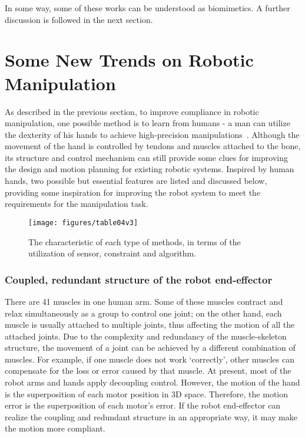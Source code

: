 \documentclass[journal,twoside,web]{ieeecolor}
\begin{document}
In some way, some of these works can be understood as biomimetics. A further discussion is followed in the next section.

\section{Some New Trends on Robotic Manipulation}
\label{sec:compliant_advanced}

As described in the previous section, to improve compliance in robotic manipulation, one possible method is to learn from humans - a man can utilize the dexterity of his hands to achieve high-precision manipulations~\cite{Wu2015}. 
Although the movement of the hand is controlled by tendons and muscles attached to the bone, its structure and control mechanism can still provide some clues for improving the design and motion planning for existing robotic systems. 
Inspired by human hands, two possible but essential features are listed and discussed below, providing some inspiration for improving the robot system to meet the requirements for the manipulation task.


\begin{figure*}[h]
    \centering
    \texttt{[image: figures/table04v3]}
    \caption{The characteristic of each type of methods, in terms of the utilization of sensor, constraint and algorithm.}
    \label{fig:table02}
\end{figure*}

\subsubsection{Coupled, redundant structure of the robot end-effector}

There are 41 muscles in one human arm. 
Some of these muscles contract and relax simultaneously as a group to control one joint; on the other hand, each muscle is usually attached to multiple joints, thus affecting the motion of all the attached joints.
Due to the complexity and redundancy of the muscle-skeleton structure, the movement of a joint can be achieved by a different combination of muscles.
For example, if one muscle does not work `correctly', other muscles can compensate for the loss or error caused by that muscle. 
At present, most of the robot arms and hands apply decoupling control. However, the motion of the hand is the superposition of each motor position in 3D space. Therefore, the motion error is the superposition of each motor's error. 
If the robot end-effector can realize the coupling and redundant structure in an appropriate way, it may make the motion more compliant. 
\end{document}
